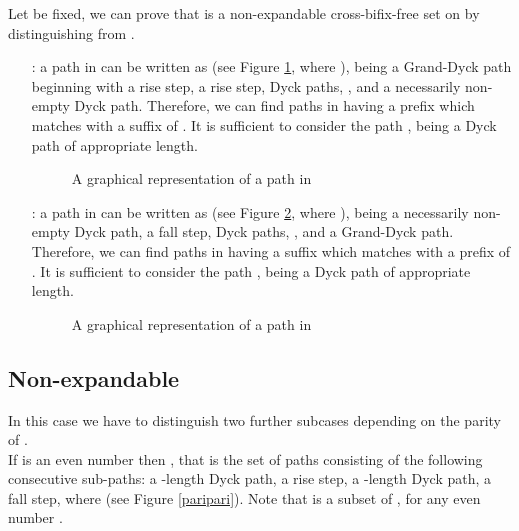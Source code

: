 \documentclass[a4paper,11pt]{article}
\newcommand{\cvd}{\hfill \bigskip}
\begin{document}
Let  be fixed, we can prove that  is a
non-expandable cross-bifix-free set on  by
distinguishing  from .
\begin{itemize}
\item[  :] a path  in  can be written as  (see Figure \ref{classep}, where
), being  a Grand-Dyck path beginning with a rise
step,  a rise step,  Dyck paths, ,
and  a necessarily non-empty Dyck path. Therefore, we
can find paths in  having a prefix which matches
with a suffix of . It is sufficient to consider the path
, being  a Dyck path of
appropriate length.

\begin{figure}[!htb]
\begin{center}
 \caption{\small{A
graphical representation of a path  in } \label{classep}}\vspace{-15pt}
\end{center}
\end{figure}

\item[  :] a path  in 
can be written as  (see
Figure \ref{classepnegativa}, where ), being  a
necessarily non-empty Dyck path,  a fall step,
 Dyck paths, , and  a
Grand-Dyck path. Therefore, we can find paths in 
having a suffix which matches with a prefix of . It is
sufficient to consider the path ,
being  a Dyck path of appropriate length.

\begin{figure}[!htb]
\begin{center}
 \caption{\small{A
graphical representation of a path  in } \label{classepnegativa}}\vspace{-12pt}
\end{center}
\end{figure}
\end{itemize}
\cvd

\subsection{Non-expandable }
In this case we have to distinguish
two further subcases depending on the parity of .\\

If  is an even number then , that is the set of paths consisting
of the following consecutive sub-paths: a -length Dyck path, a
rise step, a -length Dyck path, a fall step, where  (see Figure \ref{paripari}). Note that
 is a subset of , for any even
number .
\end{document}

